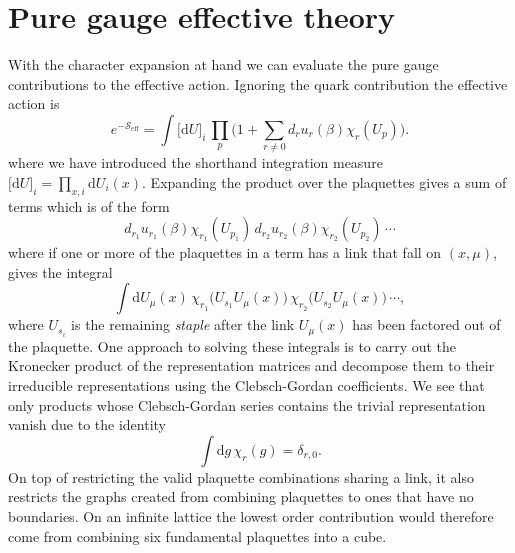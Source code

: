 \section{Pure gauge effective theory} \label{sec-pure-gauge-theory}

With the character expansion at hand we can evaluate the pure gauge
contributions to the effective action. Ignoring the quark contribution the
effective action is
%
\begin{equation}
  e^{-\mathcal{S}_{\text{eff}}} = \int \big[ \mathrm{d} U \big]_i \, \prod_p
    \bigg(1 + \sum_{r \neq 0} d_r u_r(\beta) \chi_r (U_p) \bigg).
\end{equation}
%
where we have introduced the shorthand integration measure $\big[ \mathrm{d} U
\big]_i = \prod_{x,i} \mathrm{d} U_{i}(x)$.  Expanding the product over the
plaquettes gives a sum of terms which is of the form
%
\begin{equation}
  d_{r_1} u_{r_1}(\beta) \chi_{r_1}(U_{p_1}) \, 
  d_{r_2} u_{r_2}(\beta) \chi_{r_2}(U_{p_2}) \, \cdots
\end{equation}
%
where if one or more of the plaquettes in a term has a link that fall on
$(x,\mu)$, gives the integral
%
\begin{equation}
  \int \mathrm{d} U_{\mu}(x) \, \chi_{r_1} \big(U_{s_1} U_{\mu}(x) \big) \,
    \chi_{r_2} \big(U_{s_2} U_{\mu}(x) \big) \, \cdots,
\end{equation}
%
where $U_{s_i}$ is the remaining \emph{staple} after the link $U_{\mu}(x)$ has
been factored out of the plaquette. One approach to solving these integrals is
to carry out the Kronecker product of the representation matrices and
decompose them to their irreducible representations using the Clebsch-Gordan
coefficients. We see that only products whose Clebsch-Gordan series contains the
trivial representation vanish due to the identity
%
\begin{equation}
  \int \mathrm{d} g \, \chi_r (g) = \delta_{r,0}.
\end{equation}
%
On top of restricting the valid plaquette combinations sharing a link, it also
restricts the graphs created from combining plaquettes to ones that have no
boundaries. On an infinite lattice the lowest order contribution would therefore
come from combining six fundamental plaquettes into a cube.

